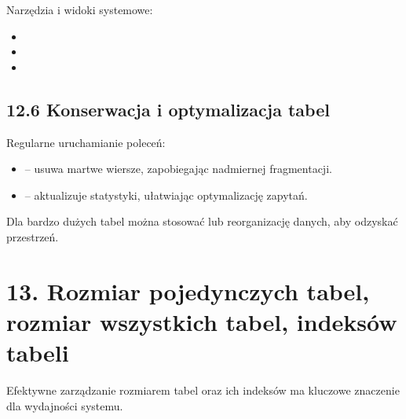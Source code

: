 \documentclass[a4paper,11pt,polish]{sphinxmanual}
\begin{document}
\sphinxAtStartPar
Narzędzia i widoki systemowe:
\begin{itemize}
\item {} 
\sphinxAtStartPar
{}

\item {} 
\sphinxAtStartPar
{}

\item {} 
\sphinxAtStartPar
{}

\end{itemize}


\subsection{12.6 Konserwacja i optymalizacja tabel}
\label{\detokenize{Konfiguracja_baz_danych/Konfiguracja_baz_danych:konserwacja-i-optymalizacja-tabel}}
\sphinxAtStartPar
Regularne uruchamianie poleceń:
\begin{itemize}
\item {} 
\sphinxAtStartPar
{} – usuwa martwe wiersze, zapobiegając nadmiernej fragmentacji.

\item {} 
\sphinxAtStartPar
{} – aktualizuje statystyki, ułatwiając optymalizację zapytań.

\end{itemize}

\sphinxAtStartPar
Dla bardzo dużych tabel można stosować  lub reorganizację danych, aby odzyskać przestrzeń.


\section{13. Rozmiar pojedynczych tabel, rozmiar wszystkich tabel, indeksów tabeli}
\label{\detokenize{Konfiguracja_baz_danych/Konfiguracja_baz_danych:rozmiar-pojedynczych-tabel-rozmiar-wszystkich-tabel-indeksow-tabeli}}
\sphinxAtStartPar
Efektywne zarządzanie rozmiarem tabel oraz ich indeksów ma kluczowe znaczenie dla wydajności systemu.
\end{document}
